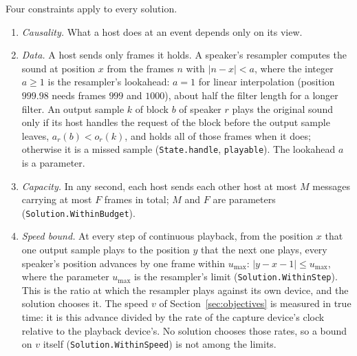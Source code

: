 \documentclass[11pt,a4paper]{article}
\newcommand{\lean}[1]{\texttt{#1}}
\theoremstyle{definition}
\begin{document}
Four constraints apply to every solution.
\begin{enumerate}
\item \emph{Causality.} What a host does at an event depends only on its
  view.
\item \emph{Data.} A host sends only frames it holds. A speaker's resampler
  computes the sound at position $x$ from the frames $n$ with $|n - x| < a$,
  where the integer $a \ge 1$ is the resampler's lookahead: $a = 1$ for
  linear interpolation (position $999.98$ needs frames $999$ and $1000$),
  about half the filter length for a longer filter. An output sample $k$
  of block $b$ of speaker $r$ plays the original sound only if its host
  handles the request of the block before the output sample leaves,
  $a_r(b) < o_r(k)$, and holds all of those frames when it does; otherwise
  it is a missed sample (\lean{State.handle}, \lean{playable}). The
  lookahead $a$ is a parameter.
\item \emph{Capacity.} In any second, each host sends each other host at
  most $M$ messages carrying at most $F$ frames in total; $M$ and $F$ are
  parameters (\lean{Solution.WithinBudget}).
\item \emph{Speed bound.} At every step of continuous playback, from the
  position $x$ that one output sample plays to the position $y$ that the
  next one plays, every speaker's position advances by one frame within
  $u_{\max}$: $|y - x - 1| \le u_{\max}$, where the parameter
  $u_{\max}$ is the resampler's limit (\lean{Solution.WithinStep}). This
  is the ratio at which the resampler plays against its own device, and the
  solution chooses it. The speed $v$ of Section~\ref{sec:objectives} is
  measured in true time: it is this advance divided by the rate of the
  capture device's clock relative to the playback device's. No solution
  chooses those rates, so a bound on $v$ itself
  (\lean{Solution.WithinSpeed}) is not among the limits.
\end{enumerate}
\end{document}
